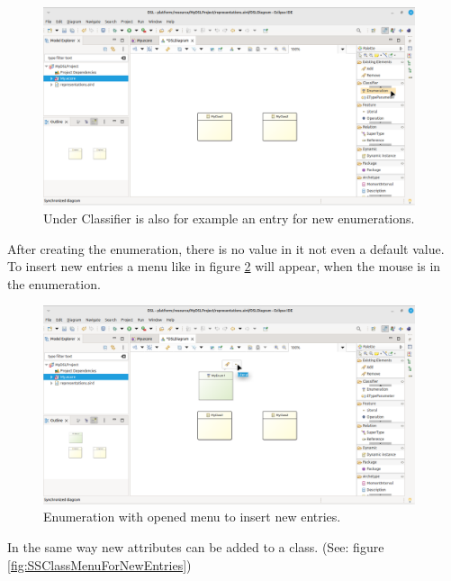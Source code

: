 \documentclass[a4paper,10pt]{article}
\newcommand{\dashAndSpace}{\textendash \space}
\newcommand{\ScreenshotWidth}{0.975}
\begin{document}
\begin{figure}[H]
\centering
\includegraphics[width=\ScreenshotWidth\textwidth]{./Screenshots/SS_12.png}
\caption{Under Classifier is also for example an entry for new enumerations.}
\label{fig:SSShowNewEnumerationMenuEntry}
\end{figure}

After creating the enumeration, there is no value in it \dashAndSpace not even a default value. To insert new entries a menu like in figure \ref{fig:SSEnumMenuForNewEntries} will appear, when the mouse is in the enumeration.

\begin{figure}[H]
\centering
\includegraphics[width=\ScreenshotWidth\textwidth]{./Screenshots/SS_13.png}
\caption{Enumeration with opened menu to insert new entries.}
\label{fig:SSEnumMenuForNewEntries}
\end{figure}

In the same way new attributes can be added to a class. (See: figure \ref{fig:SSClassMenuForNewEntries})
\end{document}
